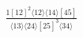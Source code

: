\documentclass[varwidth, border=5pt]{standalone}
\begin{document}
\begin{my}
$\begin{gathered}
\scriptscriptstyle\frac{1[12]^2⟨12⟩⟨14⟩[45]}{⟨13⟩⟨24⟩[25]^3⟨34⟩}
\end{gathered}$
\end{my}
\end{document}
